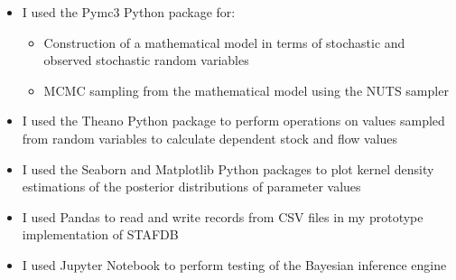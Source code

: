 \documentclass[ %
                    author={Tom Jager},
                supervisor={Dr. Daniel Schien},
                    degree={MEng},
                     title={A Bayesian Inference Engine for Calibrating Uncertainty over UMIS Structured MFA Systems},
                  subtitle={},
                      type={research},
                      year={2019} ]{dissertation}
\begin{document}
\begin{itemize}
    \item I used the Pymc3 \cite{salvatier2016probabilistic} Python package for:
    
    \begin{itemize}
        \item Construction of a mathematical model in terms of stochastic and observed stochastic random variables
        \item MCMC sampling from the mathematical model using the NUTS sampler
    \end{itemize}
    
    \item I used the Theano \cite{al2016theano} Python package to perform operations on values sampled from random variables to calculate dependent stock and flow values
    
    \item I used the Seaborn \cite{michael_waskom_2017_883859} and Matplotlib \cite{Hunter:2007} Python packages to plot kernel density estimations of the posterior distributions of parameter values
    
    \item I used Pandas \cite{mckinney-proc-scipy-2010} to read and write records from CSV files in my prototype implementation of STAFDB
    
    \item I used Jupyter Notebook \cite{kluyver2016jupyter} to perform testing of the Bayesian inference engine
 
\end{itemize}
\end{document}
